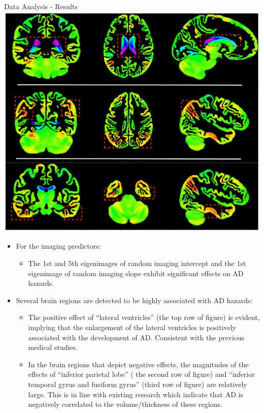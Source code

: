\documentclass[
  ignorenonframetext,
]{beamer}
\providecommand{\tightlist}{%
  \setlength{\itemsep}{0pt}\setlength{\parskip}{0pt}}
\begin{document}
\begin{frame}{Data Analysis - Results}
\protect\hypertarget{data-analysis---results}{}
\includegraphics[width=0.3\linewidth,height=0.5\textheight,style="float:right; padding:10px"]{images/fig4}

\begin{itemize}
\tightlist
\item
  For the imaging predictors:

  \begin{itemize}
  \tightlist
  \item
    The 1st and 5th eigenimages of random imaging intercept and the 1st
    eigenimage of random imaging slope exhibit significant effects on AD
    hazards.
  \end{itemize}
\item
  Several brain regions are detected to be highly associated with AD
  hazards:

  \begin{itemize}
  \item
    The positive effect of ``lateral ventricles'' (the top row of
    figure) is evident, implying that the enlargement of the lateral
    ventricles is positively associated with the development of AD.
    Consistent with the previous medical studies.
  \item
    In the brain regions that depict negative effects, the magnitudes of
    the effects of ``inferior parietal lobe'' ( the second row of
    figure) and ``inferior temporal gyrus and fusiform gyrus'' (third
    row of figure) are relatively large. This is in line with existing
    research which indicate that AD is negatively correlated to the
    volume/thickness of these regions.
  \end{itemize}
\end{itemize}
\end{frame}
\end{document}
